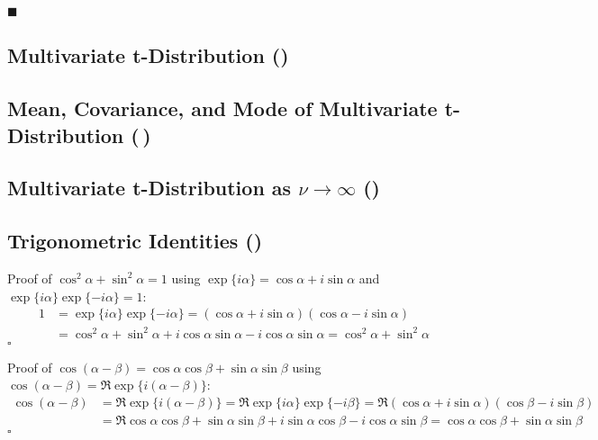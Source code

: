 \documentclass[11pt, a4paper]{scrartcl}
\newcommand{\qed}{\hfill\(\square\)}
\newcommand{\eot}{\hfill\(\blacksquare\)}
\newcommand{\diffstar}{\texorpdfstring{\raisebox{-1pt}{\resizebox{!}{8pt}{\(\star\)}}}{*}}
\newcommand{\onestar}  {(\diffstar)}
\newcommand{\twostar}  {(\diffstar\,\diffstar)}
\begin{document}
			\eot

		\subsection{Multivariate t-Distribution  \onestar}

		\subsection{Mean, Covariance, and Mode of Multivariate t-Distribution  \twostar}

		\subsection{Multivariate t-Distribution as \( \nu \to \infty \)  \onestar}

		\subsection{Trigonometric Identities  \onestar}
			Proof of \( \cos^2\alpha + \sin^2\alpha = 1 \) using \( \exp\{i\alpha\} = \cos\alpha + i \sin\alpha \) and \( \exp\{i\alpha\} \exp\{-i\alpha\} = 1 \):
			\begin{align}
				1
					&= \exp\{i\alpha\} \exp\{-i\alpha\}
					 = (\cos\alpha + i \sin\alpha) (\cos\alpha - i \sin\alpha) \\
					&= \cos^2\alpha + \sin^2\alpha + i \cos\alpha \sin\alpha - i \cos\alpha \sin\alpha
					 = \cos^2\alpha + \sin^2\alpha
			\end{align}
			\qed

			\noindent
			Proof of \( \cos(\alpha - \beta) = \cos\alpha \cos\beta + \sin\alpha \sin\beta \) using \( \cos(\alpha - \beta) = \Re{ \exp\big\{ i (\alpha - \beta) \big\} } \):
			\begin{align}
				\cos(\alpha - \beta)
					&= \Re{ \exp\big\{ i (\alpha - \beta) \big\} }
					 = \Re{ \exp\{i \alpha\} \exp\{-i \beta\} }
					 = \Re{ (\cos\alpha + i \sin\alpha) (\cos\beta - i \sin\beta) } \\
					&= \Re{ \cos\alpha \cos\beta + \sin\alpha \sin\beta + i \sin\alpha \cos\beta - i \cos\alpha \sin\beta }
					 = \cos\alpha \cos\beta + \sin\alpha \sin\beta
			\end{align}
			\qed
\end{document}
